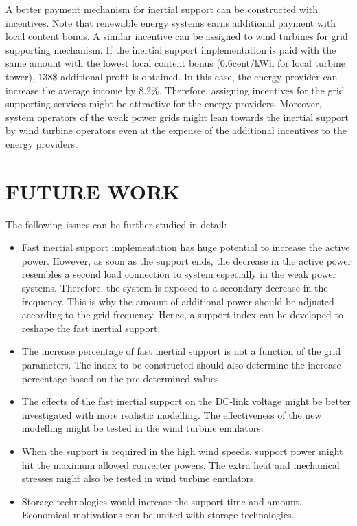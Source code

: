 A better payment mechanism for inertial support can be constructed with incentives. Note that renewable energy systems earns additional payment with local content bonus. A similar incentive can be assigned to wind turbines for grid supporting mechanism. If the inertial support implementation is paid with the same amount with the lowest local content bonus (0.6cent/kWh for local turbine tower), 138\$ additional profit is obtained. In this case, the energy provider can increase the average income by 8.2\%. Therefore, assigning incentives for the grid supporting services might be attractive for the energy providers. Moreover, system operators of the weak power grids might lean towards the inertial support by wind turbine operators even at the expense of the additional incentives to the energy providers.
\section{FUTURE WORK}
The following issues can be further studied in detail:
\begin{itemize}
	\item Fast inertial support implementation has huge potential to increase the active power. However, as soon as the support ends, the decrease in the active power resembles a second load connection to system especially in the weak power systems. Therefore, the system is exposed to a secondary decrease in the frequency. This is why the amount of additional power should be adjusted according to the grid frequency. Hence, a support index can be developed to reshape the fast inertial support. 
	\item The increase percentage of fast inertial support is not a function of the grid parameters. The index to be constructed should also determine the increase percentage based on the pre-determined values. 
	\item The effects of the fast inertial support on the DC-link voltage might be better investigated with more realistic modelling. The effectiveness of the new modelling might be tested in the wind turbine emulators. 
	\item When the support is required in the high wind speeds, support power might hit the maximum allowed converter powers. The extra heat and mechanical stresses might also be tested in wind turbine emulators. 
	\item Storage technologies would increase the support time and amount. Economical motivations can be united with storage technologies.
\end{itemize}